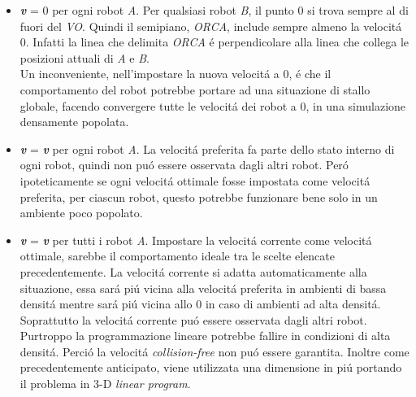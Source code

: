\begin{itemize}

\item {\bfseries\textit{v}} = 0 per ogni robot \textit{A}. Per qualsiasi robot \textit{B}, il punto 0 si trova sempre al di fuori del \textit{VO}\ap{$\tau$}. Quindi il semipiano, \textit{ORCA}\ap{$\tau$}, include sempre almeno la velocit\'a 0. Infatti la linea che delimita \textit{ORCA}\ap{$\tau$}  \'e perpendicolare alla linea che collega le posizioni attuali di \textit{A} e \textit{B}.
\\Un inconveniente, nell'impostare la nuova velocit\'a a 0, \'e che il comportamento del robot potrebbe portare ad una situazione di stallo globale, facendo convergere tutte le velocit\'a dei robot a 0, in una simulazione densamente popolata.

\item {\bfseries\textit{v}} =  {\bfseries\textit{v}} per ogni robot \textit{A}. La velocit\'a preferita fa parte dello stato interno di ogni robot, quindi non pu\'o essere osservata dagli altri robot. Per\'o ipoteticamente se ogni velocit\'a ottimale fosse impostata come velocit\'a preferita, per ciascun robot, questo potrebbe funzionare bene solo in un ambiente poco popolato.

\item {\bfseries\textit{v}} =  {\bfseries\textit{v}} per tutti i robot \textit{A}. Impostare la velocit\'a corrente come velocit\'a ottimale, sarebbe il comportamento ideale tra le scelte elencate precedentemente. 
La  velocit\'a corrente si adatta automaticamente alla situazione, essa sar\'a pi\'u vicina alla velocit\'a preferita in ambienti di bassa densit\'a mentre sar\'a pi\'u vicina allo 0 in caso di ambienti ad alta densit\'a. Soprattutto la velocit\'a corrente pu\'o essere osservata dagli altri robot. 
\\Purtroppo la programmazione lineare potrebbe fallire in condizioni di alta densit\'a. Perci\'o la velocit\'a \textit{collision-free} non pu\'o essere garantita.
Inoltre come precedentemente anticipato, viene utilizzata una dimensione in pi\'u portando il problema in 3-D \textit{linear program}.
\end{itemize}
